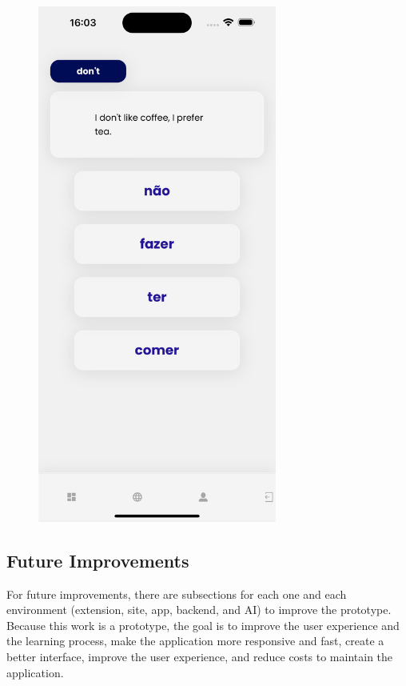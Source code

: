 \documentclass[12pt]{article}
\begin{document}
\begin{frame}{}
\begin{figure}[!h]
\begin{minipage}[b]{0.31\linewidth}
          \includegraphics[width=0.7\textwidth]{assets/19.png}
        \end{minipage}
    \end{figure}
  \end{frame}





\subsection{Future Improvements}

For future improvements, there are subsections for each one and each environment (extension, site, app, backend, and AI) to improve the prototype. Because this work is a prototype, the goal is to improve the user experience and the learning process,  make the application more responsive and fast, create a better interface, improve the user experience, and reduce costs to maintain the application.
\end{document}
